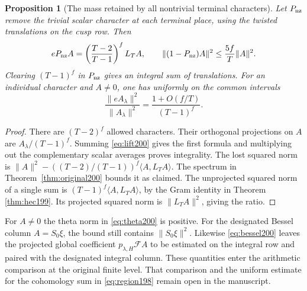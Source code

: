 \documentclass[a4paper,11pt]{article}
\newtheorem{proposition}{Proposition}[section]
\theoremstyle{definition}
\theoremstyle{remark}
\numberwithin{equation}{section}
\begin{document}
\begin{proposition}[The mass retained by all nontrivial terminal characters]
\label{prop:all200}
Let \(P_{\rm nz}\) remove the trivial scalar character at each
terminal place, using the twisted translations on the cusp row.
Then
\[
   eP_{\rm nz}A=
      \left(\frac{T-2}{T-1}\right)^f L_TA,\qquad
   \|(1-P_{\rm nz})A\|^2\le \frac{5f}{T}\|A\|^2 .
\]
Clearing \((T-1)^f\) in \(P_{\rm nz}\) gives an integral sum
of translations. For an individual character and \(A\ne0\),
one has uniformly on the common intervals
\[
     \frac{\|eA_\lambda\|^2}{\|A_\lambda\|^2}
           =\frac{1+O(f/T)}{(T-1)^f}.
\]
\end{proposition}
\begin{proof}
There are \((T-2)^f\) allowed characters. Their orthogonal
projections on \(A\) are \(A_\lambda/(T-1)^f\).
Summing \eqref{eq:lift200} gives the first formula and
multiplying out the complementary scalar averages proves
integrality. The lost squared norm is
\(\|A\|^2-((T-2)/(T-1))^f\langle A,L_T A\rangle\).
The spectrum in Theorem~\ref{thm:original200} bounds it as
claimed. The unprojected squared norm of a single sum is
\((T-1)^f\langle A,L_T A\rangle\), by the Gram identity in
Theorem \ref{thm:hec199}.
Its projected squared norm is \(\|L_T A\|^2\), giving the ratio.
\end{proof}

For \(A\ne0\) the theta norm in \eqref{eq:theta200} is positive.
For the designated Bessel column \(A=S_0\xi\), the bound still
contains \(\|S_0\xi\|^2\). Likewise \eqref{eq:bessel200} leaves
the projected global coefficient \(p_{\lambda,H}\mathcal F A\)
to be estimated on the integral row and paired with the
designated integral column. These quantities enter the arithmetic
comparison at the original finite level. That comparison and the
uniform estimate for the cohomology sum in \eqref{eq:region198}
remain open in the manuscript.
\end{document}
